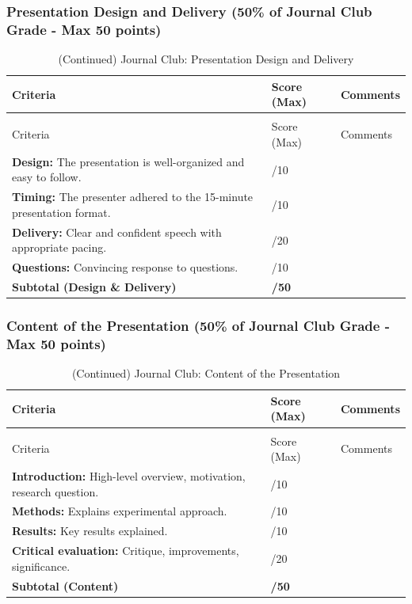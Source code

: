 \documentclass{article}
\begin{document}
\subsubsection*{Presentation Design and Delivery (50\% of Journal Club Grade - Max 50 points)}
\begin{longtable}{@{}>{\RaggedRight\arraybackslash}p{} >{\centering\arraybackslash}p{} >{\RaggedRight\arraybackslash}p{}@{}}
\toprule
Criteria & Score (Max) & Comments \\
\midrule
\endfirsthead
\caption[]{(Continued) Journal Club: Presentation Design and Delivery} \\
\toprule
Criteria & Score (Max) & Comments \\
\midrule
\endhead
\bottomrule
\endfoot
\textbf{Design:} The presentation is well-organized and easy to follow. & /10 & \\
\addlinespace
\textbf{Timing:} The presenter adhered to the 15-minute presentation format. & /10 & \\
\addlinespace
\textbf{Delivery:} Clear and confident speech with appropriate pacing. & /20 & \\
\addlinespace
\textbf{Questions:} Convincing response to questions. & /10 & \\
\midrule
\textbf{Subtotal (Design \& Delivery)} & \textbf{/50} & \\
\end{longtable}

\subsubsection*{Content of the Presentation (50\% of Journal Club Grade - Max 50 points)}
\begin{longtable}{@{}>{\RaggedRight\arraybackslash}p{} >{\centering\arraybackslash}p{} >{\RaggedRight\arraybackslash}p{}@{}}
\toprule
Criteria & Score (Max) & Comments \\
\midrule
\endfirsthead
\caption[]{(Continued) Journal Club: Content of the Presentation} \\
\toprule
Criteria & Score (Max) & Comments \\
\midrule
\endhead
\bottomrule
\endfoot
\textbf{Introduction:} High-level overview, motivation, research question. & /10 & \\
\addlinespace
\textbf{Methods:} Explains experimental approach. & /10 & \\
\addlinespace
\textbf{Results:} Key results explained. & /10 & \\
\addlinespace
\textbf{Critical evaluation:} Critique, improvements, significance. & /20 & \\
\midrule
\textbf{Subtotal (Content)} & \textbf{/50} & \\
\end{longtable}
\end{document}
